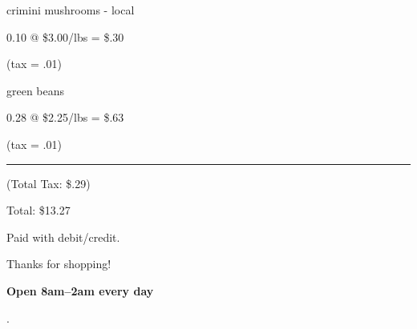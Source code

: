 \documentclass[12pt]{article}
\begin{document}
crimini mushrooms - local

\hskip 1cm 0.10 @ \$3.00/lbs = \$.30

\hskip 2cm (tax = .01)

green beans

\hskip 1cm 0.28 @ \$2.25/lbs = \$.63

\hskip 2cm (tax = .01)


\vskip 3pt
\hrule
\vskip 3pt
(Total Tax: \$.29)

Total: \$13.27

Paid with debit/credit.


\vskip 0.5cm
\begin{center}
Thanks for shopping!


\vskip 0.2cm
{\large \textbf{Open 8am--2am every day}}
\end{center}
\vskip 1.5cm

.
\end{document}
